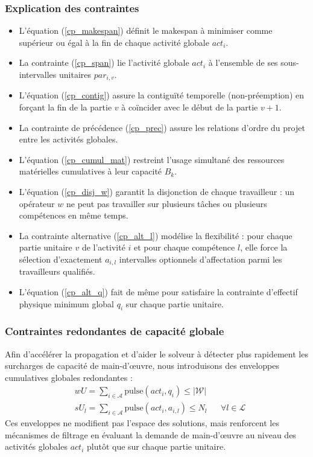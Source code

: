\subsubsection{Explication des contraintes}
\begin{itemize}
    \item L'équation (\ref{cp_makespan}) définit le makespan à minimiser comme supérieur ou égal à la fin de chaque activité globale $act_i$.
    \item La contrainte (\ref{cp_span}) lie l'activité globale $act_i$ à l'ensemble de ses sous-intervalles unitaires $par_{i,v}$.
    \item L'équation (\ref{cp_contig}) assure la contiguïté temporelle (non-préemption) en forçant la fin de la partie $v$ à coïncider avec le début de la partie $v+1$.
    \item La contrainte de précédence (\ref{cp_prec}) assure les relations d'ordre du projet entre les activités globales.
    \item L'équation (\ref{cp_cumul_mat}) restreint l'usage simultané des ressources matérielles cumulatives à leur capacité $B_k$.
    \item L'équation (\ref{cp_disj_w}) garantit la disjonction de chaque travailleur : un opérateur $w$ ne peut pas travailler sur plusieurs tâches ou plusieurs compétences en même temps.
    \item La contrainte alternative (\ref{cp_alt_l}) modélise la flexibilité : pour chaque partie unitaire $v$ de l'activité $i$ et pour chaque compétence $l$, elle force la sélection d'exactement $a_{i,l}$ intervalles optionnels d'affectation parmi les travailleurs qualifiés.
    \item L'équation (\ref{cp_alt_q}) fait de même pour satisfaire la contrainte d'effectif physique minimum global $q_i$ sur chaque partie unitaire.
\end{itemize}

\subsubsection{Contraintes redondantes de capacité globale}
Afin d'accélérer la propagation et d'aider le solveur à détecter plus rapidement les surcharges de capacité de main-d'œuvre, nous introduisons des enveloppes cumulatives globales redondantes :
\begin{align}
    & wU = \sum_{i \in \mathcal{A}} \text{pulse}(act_i, q_i) \leq |\mathcal{W}| \label{cp_red_w} \\
    & sU_l = \sum_{i \in \mathcal{A}} \text{pulse}(act_i, a_{i,l}) \leq N_l && \forall l \in \mathcal{L} \label{cp_red_l}
\end{align}
Ces enveloppes ne modifient pas l'espace des solutions, mais renforcent les mécanismes de filtrage en évaluant la demande de main-d'œuvre au niveau des activités globales $act_i$ plutôt que sur chaque partie unitaire.

